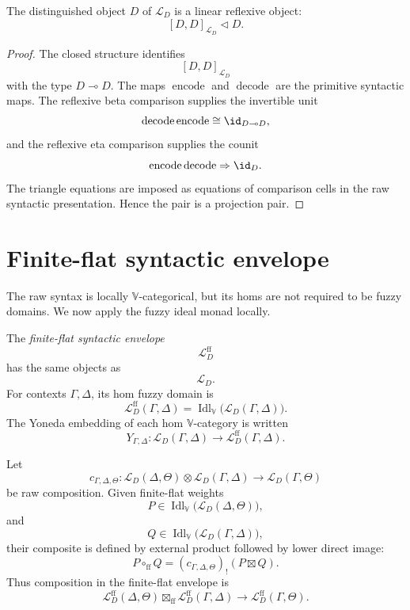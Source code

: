 \begin{proposition}
\label{prop:raw-syntactic-linear-reflexivity}
The distinguished object \(D\) of \(\mathcal L_D\) is a linear reflexive object:
\[
    [D,D]_{\mathcal L_D}\triangleleft D.
\]
\end{proposition}

\begin{proof}
The closed structure identifies
\[
    [D,D]_{\mathcal L_D}
\]
with the type \(D\multimap D\).  The maps
\(\operatorname{encode}\) and \(\operatorname{decode}\) are the primitive
syntactic maps.  The reflexive beta comparison supplies the invertible unit
\[
    \operatorname{decode}\operatorname{encode}
    \cong
    \id_{D\multimap D},
\]
and the reflexive eta comparison supplies the counit
\[
    \operatorname{encode}\operatorname{decode}
    \Rightarrow
    \id_D.
\]
The triangle equations are imposed as equations of comparison cells in the raw
syntactic presentation.  Hence the pair is a projection pair.
\end{proof}

\section{Finite-flat syntactic envelope}
\label{sec:finite-flat-syntactic-envelope}

The raw syntax is locally \(\mathbb V\)-categorical, but its homs are not
required to be fuzzy domains.  We now apply the fuzzy ideal monad locally.

\begin{definition}
\label{def:finite-flat-syntactic-envelope}
The \emph{finite-flat syntactic envelope}
\[
    \mathcal L_D^{\mathrm{ff}}
\]
has the same objects as
\[
    \mathcal L_D.
\]
For contexts \(\Gamma,\Delta\), its hom fuzzy domain is
\[
    \mathcal L_D^{\mathrm{ff}}(\Gamma,\Delta)
    =
    \operatorname{Idl}_{\mathbb V}
    \bigl(\mathcal L_D(\Gamma,\Delta)\bigr).
\]
The Yoneda embedding of each hom \(\mathbb V\)-category is written
\[
    Y_{\Gamma,\Delta}:
    \mathcal L_D(\Gamma,\Delta)
    \longrightarrow
    \mathcal L_D^{\mathrm{ff}}(\Gamma,\Delta).
\]
\end{definition}

Let
\[
    c_{\Gamma,\Delta,\Theta}:
    \mathcal L_D(\Delta,\Theta)\otimes
    \mathcal L_D(\Gamma,\Delta)
    \longrightarrow
    \mathcal L_D(\Gamma,\Theta)
\]
be raw composition.  Given finite-flat weights
\[
    P\in
    \operatorname{Idl}_{\mathbb V}
    \bigl(\mathcal L_D(\Delta,\Theta)\bigr),
\]
and
\[
    Q\in
    \operatorname{Idl}_{\mathbb V}
    \bigl(\mathcal L_D(\Gamma,\Delta)\bigr),
\]
their composite is defined by external product followed by lower direct image:
\[
    P\circ_{\mathrm{ff}}Q
    =
    (c_{\Gamma,\Delta,\Theta})_!
    (P\boxtimes Q).
\]
Thus composition in the finite-flat envelope is
\[
    \mathcal L_D^{\mathrm{ff}}(\Delta,\Theta)
    \boxtimes_{\mathrm{ff}}
    \mathcal L_D^{\mathrm{ff}}(\Gamma,\Delta)
    \longrightarrow
    \mathcal L_D^{\mathrm{ff}}(\Gamma,\Theta).
\]

